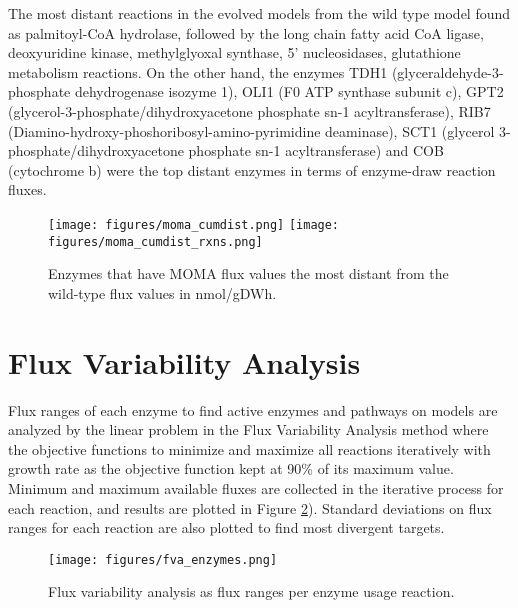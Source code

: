  The most distant reactions in the evolved models from the wild type model found as palmitoyl-CoA hydrolase, followed by the long chain fatty acid CoA ligase, deoxyuridine kinase, methylglyoxal synthase, 5' nucleosidases, glutathione metabolism reactions. On the other hand, the enzymes TDH1 (glyceraldehyde-3-phosphate dehydrogenase isozyme 1), OLI1 (F0 ATP synthase subunit c), GPT2 (glycerol-3-phosphate/dihydroxyacetone phosphate sn-1 acyltransferase), RIB7 (Diamino-hydroxy-phoshoribosyl-amino-pyrimidine deaminase), SCT1 (glycerol 3-phosphate/dihydroxyacetone phosphate sn-1 acyltransferase) and COB (cytochrome b) were the top distant enzymes in terms of enzyme-draw reaction fluxes.

\begin{figure}[H]
  \begin{center}
  \texttt{[image: figures/moma\_cumdist.png]}
  \texttt{[image: figures/moma\_cumdist\_rxns.png]}
  \caption[Enzymes that have MOMA flux values the most distant from the wild-type flux values in nmol/gDWh]{Enzymes that have MOMA flux values the most distant from the wild-type flux values in nmol/gDWh.}
  \label{fig:moma_cumdist}
  \end{center}
\end{figure}


\section{Flux Variability Analysis}
Flux ranges of each enzyme to find active enzymes and pathways on models are analyzed by the linear problem in the Flux Variability Analysis method where the objective functions to minimize and maximize all reactions iteratively with growth rate as the objective function kept at 90\% of its maximum value. Minimum and maximum available fluxes are collected in the iterative process for each reaction, and results are plotted in Figure \ref{fig:fva_enzymes}). Standard deviations on flux ranges for each reaction are also plotted to find most divergent targets.

\begin{figure}[H]
  \begin{center}
  \texttt{[image: figures/fva\_enzymes.png]}
  \caption[Flux variability analysis results as flux ranges per enzyme usage reaction, sorted by the wild-type flux ranges]{Flux variability analysis as flux ranges per enzyme usage reaction.}
  \end{center}
  \label{fig:fva_enzymes}
  \end{figure}

